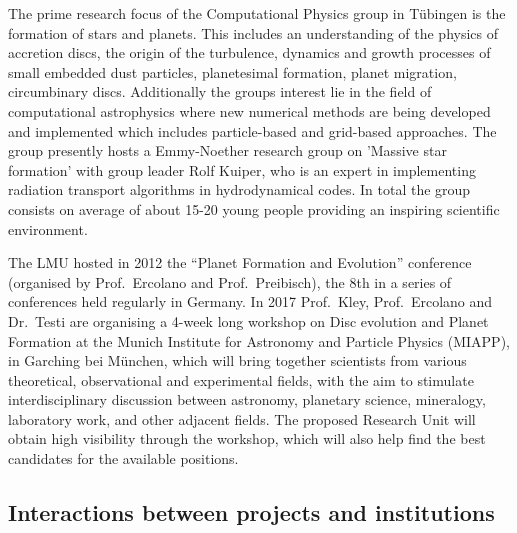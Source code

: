 \documentclass[10pt,fleqn,twoside]{article}
\begin{document}

% 
The prime research focus of the Computational Physics group in T\"ubingen is the
formation of stars and planets. This includes an understanding
of the physics of accretion discs, the origin of the turbulence, dynamics
and growth processes of small embedded dust particles, planetesimal formation,
planet migration, circumbinary discs. Additionally the groups interest lie in the
field of computational astrophysics where new numerical methods are being developed and
implemented which includes particle-based and grid-based approaches.
The group presently hosts a Emmy-Noether research group on 'Massive star formation'
with group leader Rolf Kuiper, who is an expert in implementing
radiation transport algorithms in hydrodynamical codes. In total the
group consists on average of about 15-20 young people providing an
inspiring scientific environment. 

The LMU hosted in 2012 the ``Planet Formation and Evolution''
conference (organised by Prof.~Ercolano and Prof.~Preibisch), the 8th
in a series of conferences held regularly in Germany. In 2017
Prof.~Kley, Prof.~Ercolano and Dr.~Testi are organising a 4-week
long workshop on Disc evolution and Planet Formation at the Munich
Institute for Astronomy and Particle Physics (MIAPP), in Garching bei
M\"unchen, which will bring
together scientists from various theoretical, observational and
experimental fields, with the aim to stimulate interdisciplinary
discussion between astronomy, planetary science, mineralogy,
laboratory work, and other adjacent fields. The proposed Research Unit
will obtain high visibility through the workshop, which will also help
find the best candidates for the available positions. 

\subsection{Interactions between projects and institutions}
\end{document}
